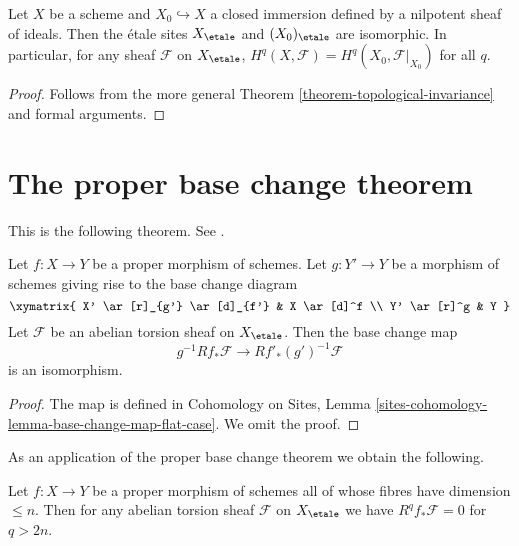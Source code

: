 \begin{proposition}
\label{proposition-topological-invariance}
Let $X$ be a scheme and $X_0\hookrightarrow X$ a closed immersion defined by a
nilpotent sheaf of ideals. Then the \'etale sites $X_\etale$ and
$(X_0)_\etale$ are
isomorphic. In particular, for any sheaf $\mathcal{F}$ on
$X_\etale$, $H^q(X,
\mathcal{F}) = H^q(X_0, \mathcal{F}|_{X_0})$ for all $q$.
\end{proposition}

\begin{proof}
Follows from the more general
Theorem \ref{theorem-topological-invariance}
and formal arguments.
\end{proof}








\section{The proper base change theorem}
\label{section-proper-base-change}

\noindent
This is the following theorem. See \cite[XII, Theorem 5.1]{SGA4}.

\begin{theorem}
\label{theorem-proper-base-change}
Let $f : X \to Y$ be a proper morphism of schemes. Let $g : Y' \to Y$ be
a morphism of schemes giving rise to the base change diagram
$$
\xymatrix{
X' \ar[r]_{g'} \ar[d]_{f'} & X \ar[d]^f \\
Y' \ar[r]^g & Y
}
$$
Let $\mathcal{F}$ be an abelian torsion sheaf on $X_\etale$.
Then the base change map
$$
g^{-1}Rf_*\mathcal{F} \longrightarrow Rf'_*(g')^{-1}\mathcal{F}
$$
is an isomorphism.
\end{theorem}

\begin{proof}
The map is defined in
Cohomology on Sites, Lemma
\ref{sites-cohomology-lemma-base-change-map-flat-case}.
We omit the proof.
\end{proof}

\noindent
As an application of the proper base change theorem we obtain the following.

\begin{lemma}
\label{lemma-cohomological-dimension-proper}
Let $f : X \to Y$ be a proper morphism of schemes
all of whose fibres have dimension $\leq n$.
Then for any abelian torsion sheaf $\mathcal{F}$ on $X_\etale$
we have $R^qf_*\mathcal{F} = 0$ for $q > 2n$.
\end{lemma}

